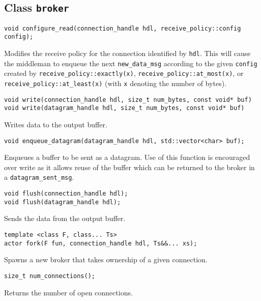 \subsection{Class \texttt{broker}}
\label{broker-class}

\begin{lstlisting}
void configure_read(connection_handle hdl, receive_policy::config config);
\end{lstlisting}

Modifies the receive policy for the connection identified by \lstinline^hdl^.
This will cause the middleman to enqueue the next \lstinline^new_data_msg^
according to the given \lstinline^config^ created by
\lstinline^receive_policy::exactly(x)^, \lstinline^receive_policy::at_most(x)^,
or \lstinline^receive_policy::at_least(x)^ (with \lstinline^x^ denoting the
number of bytes).

\begin{lstlisting}
void write(connection_handle hdl, size_t num_bytes, const void* buf)
void write(datagram_handle hdl, size_t num_bytes, const void* buf)
\end{lstlisting}

Writes data to the output buffer.

\begin{lstlisting}
void enqueue_datagram(datagram_handle hdl, std::vector<char> buf);
\end{lstlisting}

Enqueues a buffer to be sent as a datagram. Use of this function is encouraged
over write as it allows reuse of the buffer which can be returned to the broker
in a \lstinline^datagram_sent_msg^.

\begin{lstlisting}
void flush(connection_handle hdl);
void flush(datagram_handle hdl);
\end{lstlisting}

Sends the data from the output buffer.

\begin{lstlisting}
template <class F, class... Ts>
actor fork(F fun, connection_handle hdl, Ts&&... xs);
\end{lstlisting}

Spawns a new broker that takes ownership of a given connection.

\begin{lstlisting}
size_t num_connections();
\end{lstlisting}

Returns the number of open connections.

